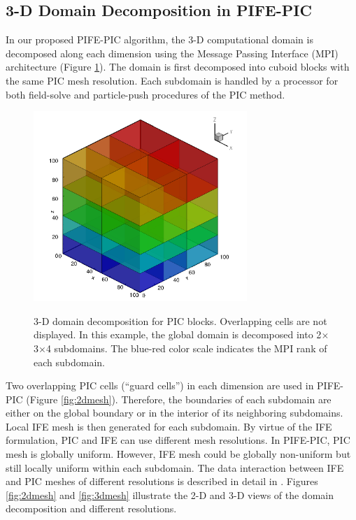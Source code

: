 \documentclass{siamart171218}
\begin{document}
\subsection{3-D Domain Decomposition in PIFE-PIC}

In our proposed PIFE-PIC algorithm,
the 3-D computational domain is decomposed along each dimension
using the Message Passing Interface (MPI) architecture (Figure \ref{fig:pifepic:blocks}).
The domain is first decomposed into cuboid blocks with the same PIC mesh resolution.
Each subdomain is handled by a processor for both field-solve
and particle-push procedures of the PIC method.
%
\begin{figure}[ht!]
\centering
{\includegraphics[width=0.72\textwidth]{pic_block_all.png}}
\caption{3-D domain decomposition for PIC blocks. Overlapping cells are not displayed.
In this example, the global domain is decomposed into 2$\times$3$\times$4 subdomains.
The blue-red color scale indicates the MPI rank of each subdomain.}
\label{fig:pifepic:blocks}
\end{figure}
%
Two overlapping PIC cells (``guard cells'') in each dimension are used in PIFE-PIC
(Figure \ref{fig:2dmesh}).
Therefore, the boundaries of each subdomain are either on the global boundary
or in the interior of its neighboring subdomains.
Local IFE mesh is then generated for each subdomain.
By virtue of the IFE formulation,
PIC and IFE can use different mesh resolutions.
In PIFE-PIC, PIC mesh is globally uniform.
However, IFE mesh could be globally non-uniform
but still locally uniform within each subdomain.
The data interaction between IFE and PIC meshes of different resolutions
is described in detail in \cite{RK_IEEE_2006_Plume_HybridGrid}.
Figures \ref{fig:2dmesh} and \ref{fig:3dmesh}
illustrate the 2-D and 3-D views of the domain decomposition
and different resolutions.
\end{document}

